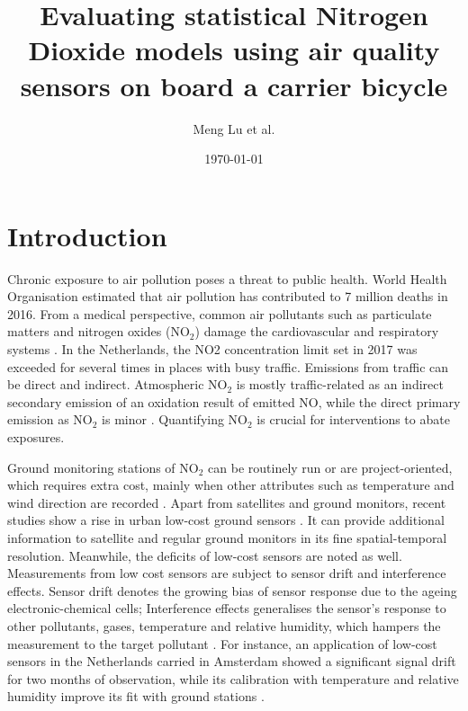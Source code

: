 \documentclass{article}
\title{Evaluating statistical Nitrogen Dioxide models using air quality sensors on board a carrier bicycle}
\author{Meng Lu et al. }
\date{\today}
\begin{document}
\maketitle

\section{Introduction}
Chronic exposure to air pollution poses a threat to public health. World Health Organisation estimated that air pollution has contributed to 7 million deaths in 2016\citep{world2018burden}. From a medical perspective, common air pollutants such as particulate matters and nitrogen oxides (NO$_2$) damage the cardiovascular and respiratory systems \citep{anderson2012clearing, pascal2009effets}.  In the Netherlands, the NO2 concentration limit set in 2017 was exceeded for several times in places with busy traffic\citep{no2}. Emissions from traffic can be direct and indirect. Atmospheric NO$_2$ is mostly traffic-related as an indirect secondary emission of an oxidation result of emitted NO, while the direct primary emission as NO$_2$ is minor \citep{ukno2,no2}. Quantifying NO$_2$ is crucial for interventions to abate exposures.


 Ground monitoring stations of NO$_2$ can be routinely run or are project-oriented, which requires extra cost, mainly when other attributes such as temperature and wind direction are recorded \citep{hoek2008review}. Apart from satellites and ground monitors, recent studies show a rise in urban low-cost ground sensors \citep{spinelle2015field, schneider2017mapping,isiugo2018assessing}. It can provide additional information to satellite and regular ground monitors in its fine spatial-temporal resolution. Meanwhile, the deficits of low-cost sensors are noted as well. Measurements from low cost sensors are subject to sensor drift and interference effects. Sensor drift denotes the growing bias of sensor response due to the ageing electronic-chemical cells; Interference effects generalises the sensor's response to other pollutants, gases, temperature and relative humidity, which hampers the measurement to the target pollutant \citep{van2019calibration}. For instance, an application of low-cost sensors in the Netherlands carried in Amsterdam showed a significant signal drift for two months of observation, while its calibration with temperature and relative humidity improve its fit with ground stations \citep{mijling2018field}. 
 
\end{document}
